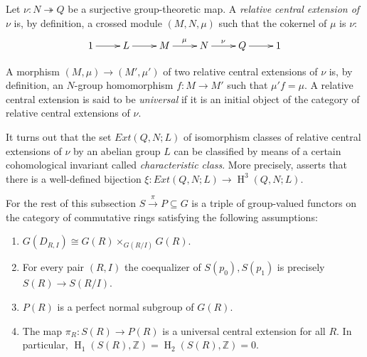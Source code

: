 \documentclass[oneside, 8pt]{amsart}
\theoremstyle{remark}
\theoremstyle{definition}
\numberwithin{lemma}{section}
\numberwithin{prop}{section}
\numberwithin{corollary}{section}
\numberwithin{externaltheorem}{section}
\DeclareMathOperator{\HH}{H}
\newcommand{\ZZ}{\mathbb{Z}}
\numberwithin{equation}{section}
\begin{document}
Let $\nu \colon N \twoheadrightarrow Q$ be a surjective group-theoretic map.
A {\it relative central extension of $\nu$} is, by definition,
a crossed module $(M, N, \mu)$ such that the cokernel of $\mu$ is $\nu$:
\begin{equation} \label{RelativeCentralExtension}
 \xymatrix{ 1 \ar[r] & L \ar[r] & M \ar^{\mu}[r] & N \ar^{\nu}[r] & Q \ar[r] & 1} \end{equation}

A morphism $(M, \mu) \to (M', \mu')$ of two relative central extensions of $\nu$ is, by definition, an $N$-group homomorphism $f\colon M \to M'$ such that $\mu' f = \mu$. 
A relative central extension is said to be {\it universal} if it is an initial object of the category of relative central extensions of $\nu$. 

It turns out that the set $Ext(Q, N; L)$ of isomorphism classes of relative central extensions of $\nu$ by an abelian group $L$ can be classified by means of a certain cohomological invariant called {\it characteristic class}. More precisely, \cite[Th{\'e}or{\`e}me~1]{Lo78} asserts that there is a well-defined bijection $\xi \colon Ext(Q, N; L) \to \HH^3(Q, N; L)$.
 
For the rest of this subsection $S \xrightarrow{\pi} P \subseteq G$ is a triple of group-valued functors on the category of commutative rings satisfying the following assumptions:
\begin{enumerate} [label=(A\arabic*)]
 \item \label{req:left-exact} $G(D_{R, I}) \cong G(R) \times_{G(R/I)} G(R)$.
 \item \label{req:coeq} For every pair $(R, I)$ the coequalizer of $S(p_0), S(p_1)$ is precisely $S(R) \to S(R/I)$.
 \item \label{req:subfunc} $P(R)$ is a perfect normal subgroup of $G(R)$.
 \item \label{req:uce} The map $ \pi_R \colon S(R) \to P(R)$ is a universal central extension for all $R$. In particular, $\HH_1(S(R), \ZZ) = \HH_2(S(R), \ZZ) = 0$.
\end{enumerate}
\end{document}
